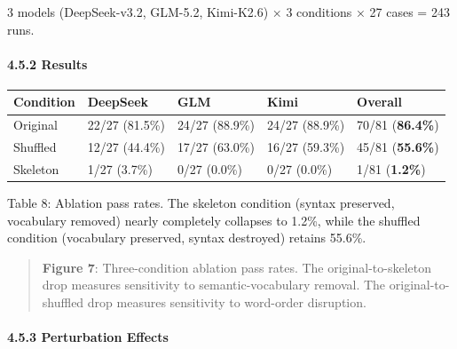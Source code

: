 3 models (DeepSeek-v3.2, GLM-5.2, Kimi-K2.6) × 3 conditions × 27 cases = 243 runs.



\paragraph{4.5.2 Results}\label{results-1}



{\def\LTcaptype{none} %

\begin{longtable}[]{@{}lllll@{}}

\toprule\noalign{}

Condition & DeepSeek & GLM & Kimi & Overall \\

\midrule\noalign{}

\endhead

\bottomrule\noalign{}

\endlastfoot

Original & 22/27 (81.5\%) & 24/27 (88.9\%) & 24/27 (88.9\%) & 70/81 (\textbf{86.4\%}) \\

Shuffled & 12/27 (44.4\%) & 17/27 (63.0\%) & 16/27 (59.3\%) & 45/81 (\textbf{55.6\%}) \\

Skeleton & 1/27 (3.7\%) & 0/27 (0.0\%) & 0/27 (0.0\%) & 1/81 (\textbf{1.2\%}) \\

\end{longtable}

}



Table 8: Ablation pass rates. The skeleton condition (syntax preserved, vocabulary removed) nearly completely collapses to 1.2\%, while the shuffled condition (vocabulary preserved, syntax destroyed) retains 55.6\%.



\begin{quote}

\textbf{Figure 7}: Three-condition ablation pass rates. The original-to-skeleton drop measures sensitivity to semantic-vocabulary removal. The original-to-shuffled drop measures sensitivity to word-order disruption.

\end{quote}



\paragraph{4.5.3 Perturbation Effects}\label{perturbation-effects}



